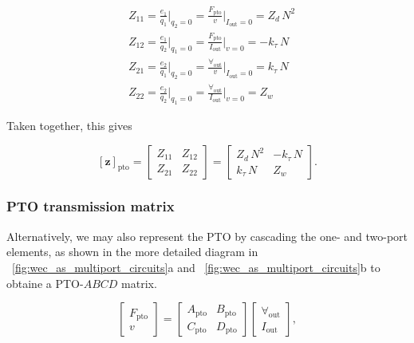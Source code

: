 \documentclass[lettersize,journal]{IEEEtran}
\begin{document}
\begin{subequations}
        \begin{align}
                &Z_{11} = \frac{e_1}{q_1} \bigg \vert_{q_2=0} 
                = \frac{F_{\textrm{pto}}}{v} \bigg \vert_{I_{\textrm{out}}=0} = Z_d \, N^2 \\[0.5em]
                &Z_{12} = \frac{e_1}{q_2} \bigg \vert_{q_1=0} 
                = \frac{F_{\textrm{pto}}}{I_{\textrm{out}}} \bigg \vert_{v=0} = -k_\tau \, N \\[0.5em]
                &Z_{21} = \frac{e_2}{q_1} \bigg \vert_{q_2=0} 
                = \frac{\forall_{\textrm{out}}}{v} \bigg \vert_{I_{\textrm{out}}=0} = k_\tau \, N \\[0.5em]
                &Z_{22} = \frac{e_2}{q_2} \bigg \vert_{q_1=0} 
                = \frac{\forall_{\textrm{out}}}{I_{\textrm{out}}} \bigg \vert_{v=0} = Z_w 
        \end{align}
\end{subequations}

\noindent{}Taken together, this gives 

 \begin{equation}
        \left[ \mathbf{z} \right]_{\textrm{pto}} 
        = 
        \begin{bmatrix} 
                Z_{11} & Z_{12} \\ 
                Z_{21} & Z_{22} 
        \end{bmatrix}
        =
        \begin{bmatrix} 
        Z_d \, N^2      & -k_\tau \, N  \\
        k_\tau \, N     & Z_w
        \end{bmatrix}.
        \label{eq:pto_impedance}
 \end{equation}

\subsubsection{PTO transmission matrix}\label{sec:pto_transmission_matrix}
Alternatively, we may also represent the PTO by cascading the one- and two-port elements, as shown in the more detailed diagram in \figurename~\ref{fig:wec_as_multiport_circuits}a and \figurename~\ref{fig:wec_as_multiport_circuits}b to obtaine a PTO-$ABCD$ matrix.

\begin{equation}
	\label{eq:pto_ABCD_mat_def}
	\begin{bmatrix} 
		F_{\textrm{pto}} \\
		v 
	\end{bmatrix} 
	= 
        \begin{bmatrix} 
	A_{\textrm{pto}} & B_{\textrm{pto}} \\ 
	C_{\textrm{pto}} & D_{\textrm{pto}} 
        \end{bmatrix}
	\begin{bmatrix} 
		\forall_{\textrm{out}} \\
		I_{\textrm{out}} 
	\end{bmatrix},
\end{equation}
\end{document}
